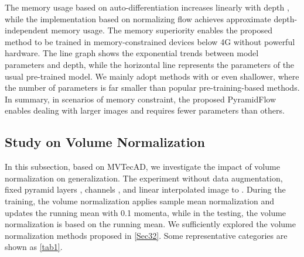 The memory usage based on auto-differentiation increases linearly with depth , while the implementation based on normalizing flow achieves approximate depth-independent memory usage.
The memory superiority enables the proposed method to be trained in memory-constrained devices below 4G without powerful hardware.
The line graph shows the exponential trends between model parameters and depth, while the horizontal line represents the parameters of the usual pre-trained model.
We mainly adopt methods with  or even shallower, where the number of parameters is far smaller than popular pre-training-based methods.
In summary, in scenarios of memory constraint, the proposed PyramidFlow enables dealing with larger images and requires fewer parameters than others.


\subsection{Study on Volume Normalization}\label{Sec42}
In this subsection, based on MVTecAD, we investigate the impact of volume normalization on generalization.
The experiment without data augmentation, fixed pyramid layers , channels , and linear interpolated image to .
During the training, the volume normalization applies sample mean normalization and updates the running mean with 0.1 momenta, while in the testing, the volume normalization is based on the running mean.
We sufficiently explored the volume normalization methods proposed in \cref{Sec32}. Some representative categories are shown as \cref{tab1}.

